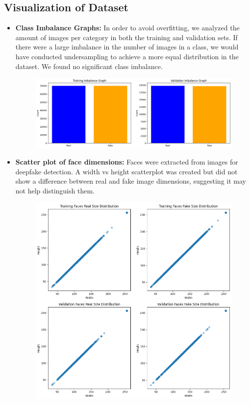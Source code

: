 \documentclass[10pt,twocolumn,letterpaper]{article}
\begin{document}
\subsection{Visualization of Dataset}
\begin{itemize}
    \item \textbf{Class Imbalance Graphs:} In order to avoid overfitting, we analyzed the amount of images per category in both the training and validation sets. If there were a large imbalance in the number of images in a class, we would have conducted undersampling to achieve a more equal distribution in the dataset. 
    We found no significant class imbalance.
    \begin{figure}[h]
    \centering
    \includegraphics[scale=0.2]{2.png}
    \end{figure}
    \item \textbf{Scatter plot of face dimensions:} Faces were extracted from images for deepfake detection. A width vs height scatterplot was created but did not show a difference between real and fake image dimensions, suggesting it may not help distinguish them.
    \begin{figure}[h]
    \centering
    \includegraphics[scale=0.26]{3.png}
    \end{figure}
    

\end{itemize}
\end{document}
